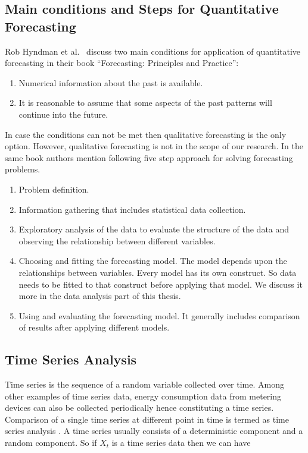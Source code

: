 \subsection{Main conditions and Steps for Quantitative Forecasting}\label{conditions}
Rob Hyndman et al.\ \cite{hyndman2014forecasting} discuss two main conditions for application of quantitative forecasting in their book ``Forecasting: Principles and Practice'':
\begin{enumerate}
\item Numerical information about the past is available.
\item It is reasonable to assume that some aspects of the past patterns will continue into the future.
\end{enumerate}
In case the conditions can not be met then qualitative forecasting is the only option. However, qualitative forecasting is not in the scope of our research. In the same book authors mention following five step approach for solving forecasting problems.
\begin{enumerate}
\item Problem definition.
\item Information gathering that includes statistical data collection.
\item Exploratory analysis of the data to evaluate the structure of the data and observing the relationship between different variables.
\item Choosing and fitting the forecasting model. The model depends upon the relationships between variables. Every model has its own construct. So data needs to be fitted to that construct before applying that model. We discuss it more in the data analysis part of this thesis.
\item Using and evaluating the forecasting model. It generally includes comparison of results after applying different models.  
\end{enumerate}    

\subsection{Time Series Analysis}
Time series is the sequence of a random variable collected over time. Among other examples of time series data, energy consumption data from metering devices can also be collected periodically hence constituting a time series. Comparison of a single time series at different point in time is termed as time series analysis \cite{box1976time}. A time series usually consists of a deterministic component and a random component\cite{mujumdarstochastic}. So if \(X_{t}\) is a time series data then we can have 

